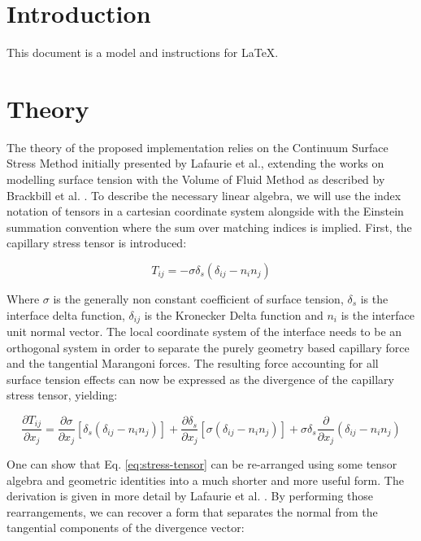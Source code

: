\documentclass[conference,final]{IEEEtran}
\begin{document}
\section{Introduction}
This document is a model and instructions for \LaTeX.
\section{Theory}

The theory of the proposed implementation relies on the Continuum Surface Stress Method initially presented by Lafaurie et al., extending the works on modelling surface tension with the Volume of Fluid Method as described by Brackbill et al. \cite{lafaurieModellingMergingFragmentation1994,brackbillContinuumMethodModeling1992}.
To describe the necessary linear algebra, we will use the index notation of tensors in a cartesian coordinate system alongside with the Einstein summation convention where the sum over matching indices is implied. First, the capillary stress tensor is introduced:

\begin{equation}
    T_{ij} = - \sigma \delta_s (\delta_{ij} - n_i n_j)
\end{equation}

Where $\sigma$ is the generally non constant coefficient of surface tension, $\delta_s$ is the interface delta function, $\delta_{ij}$ is the Kronecker Delta function and $n_i$ is the interface unit normal vector. The local coordinate system of the interface needs to be an orthogonal system in order to separate the purely geometry based capillary force and the tangential Marangoni forces.
The resulting force accounting for all surface tension effects can now be expressed as the divergence of the capillary stress tensor, yielding:

\begin{equation}
    \frac{\partial T_{ij}}{\partial x_j} = \frac{\partial \sigma}{\partial x_j} [\delta_s(\delta_{ij} - n_i n_j)] + \frac{\partial \delta_s}{\partial x_j} [\sigma (\delta_{ij} - n_i n_j)] + \sigma \delta_s \frac{\partial}{\partial x_j} (\delta_{ij} - n_i n_j) \label{eq:stress-tensor}
\end{equation}

One can show that Eq. \ref{eq:stress-tensor} can be re-arranged using some tensor algebra and geometric identities into a much shorter and more useful form. The derivation is given in more detail by Lafaurie et al. \cite{lafaurieModellingMergingFragmentation1994}. By performing those rearrangements, we can recover a form that separates the normal from the tangential components of the divergence vector:
\end{document}
